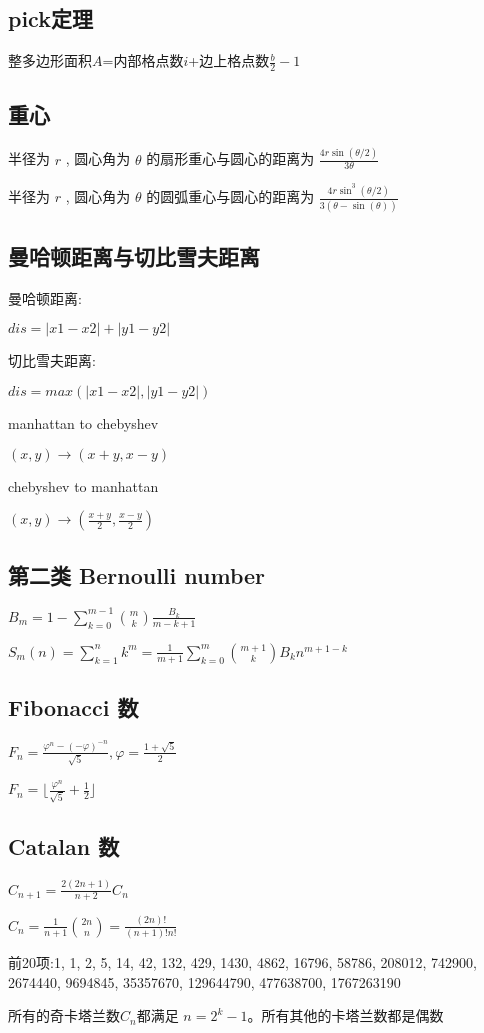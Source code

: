 \subsection{pick定理}
整多边形面积$A$=内部格点数$i$+边上格点数$\frac{b}{2}-1$\par

\subsection{重心}
半径为 $r$ , 圆心角为 $\theta$ 的扇形重心与圆心的距离为 $\frac{4r\sin(\theta/2)}{3\theta}$ \par
半径为 $r$ , 圆心角为 $\theta$ 的圆弧重心与圆心的距离为 $\frac{4r\sin^3(\theta/2)}{3(\theta-\sin(\theta))}$ \par

\subsection{曼哈顿距离与切比雪夫距离}
曼哈顿距离:\par
$dis = |x1-x2|+|y1-y2|$\par
切比雪夫距离:\par
$dis = max(|x1-x2|,|y1-y2|)$\par
manhattan to chebyshev\par
$(x,y) \rightarrow (x+y,x-y)$\par
chebyshev to manhattan\par
$(x,y) \rightarrow (\frac{x+y}{2},\frac{x-y}{2})$\par

\subsection{第二类 Bernoulli number}
$B_m = 1 - \sum_{k=0}^{m-1}{\binom{m}{k}\frac{B_{k}}{m-k+1}}$\par
$S_m(n) = \sum_{k=1}^{n}{k^{m}} = \frac{1}{m+1}\sum_{k=0}^{m}{\binom{m+1}{k}B_{k}n^{m+1-k}}$\par

\subsection{Fibonacci 数}
$F_n=\frac{\varphi^{n}-(-\varphi)^{-n}}{\sqrt{5}},\varphi=\frac{1+\sqrt{5}}{2}$\par
$F_n=\lfloor \frac{\varphi^n}{\sqrt{5}}+\frac{1}{2}\rfloor$

\subsection{Catalan 数}
$C_{n+1}=\frac{2(2n+1)}{n+2}C_n$\par
$C_n=\frac{1}{n+1}\binom{2n}{n}=\frac{(2n)!}{(n+1)!n!}$\par
前20项:1, 1, 2, 5, 14, 42, 132, 429, 1430, 4862, 16796, 58786, 208012, 742900, 2674440, 9694845, 35357670, 129644790, 477638700, 1767263190\par
所有的奇卡塔兰数$C_n$都满足 $\displaystyle n=2^{k}-1$。所有其他的卡塔兰数都是偶数

